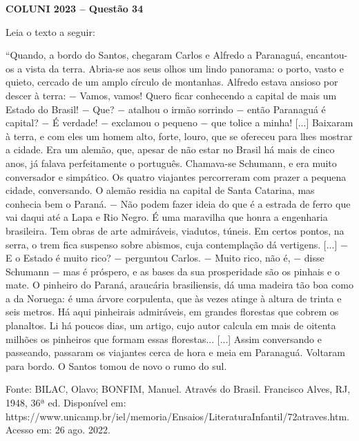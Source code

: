 \textbf{COLUNI 2023 -- Questão 34}\par\medskip Leia o texto a seguir:

\par

“Quando, a bordo do Santos, chegaram Carlos e Alfredo a Paranaguá, encantou-os a vista da terra. Abria-se aos seus olhos um lindo panorama: o porto, vasto e quieto, cercado de um amplo círculo de montanhas. Alfredo estava ansioso por descer à terra: − Vamos, vamos! Quero ficar conhecendo a capital de mais um Estado do Brasil! − Que? − atalhou o irmão sorrindo − então Paranaguá é capital? − É verdade! − exclamou o pequeno − que tolice a minha! [...] Baixaram à terra, e com eles um homem alto, forte, louro, que se ofereceu para lhes mostrar a cidade. Era um alemão, que, apesar de não estar no Brasil há mais de cinco anos, já falava perfeitamente o português. Chamava-se Schumann, e era muito conversador e simpático. Os quatro viajantes percorreram com prazer a pequena cidade, conversando. O alemão residia na capital de Santa Catarina, mas conhecia bem o Paraná. − Não podem fazer ideia do que é a estrada de ferro que vai daqui até a Lapa e Rio Negro. É uma maravilha que honra a engenharia brasileira. Tem obras de arte admiráveis, viadutos, túneis. Em certos pontos, na serra, o trem fica suspenso sobre abismos, cuja contemplação dá vertigens. [...] − E o Estado é muito rico? − perguntou Carlos. − Muito rico, não é, − disse Schumann − mas é próspero, e as bases da sua prosperidade são os pinhais e o mate. O pinheiro do Paraná, araucária brasiliensis, dá uma madeira tão boa como a da Noruega: é uma árvore corpulenta, que às vezes atinge à altura de trinta e seis metros. Há aqui pinheirais admiráveis, em grandes florestas que cobrem os planaltos. Li há poucos dias, um artigo, cujo autor calcula em mais de oitenta milhões os pinheiros que formam essas florestas... [...] Assim conversando e passeando, passaram os viajantes cerca de hora e meia em Paranaguá. Voltaram para bordo. O Santos tomou de novo o rumo do sul.

\par

Fonte: BILAC, Olavo; BONFIM, Manuel. Através do Brasil. Francisco Alves, RJ, 1948, 36ª ed. Disponível em: https://www.unicamp.br/iel/memoria/Ensaios/LiteraturaInfantil/72atraves.htm. Acesso em: 26 ago. 2022.

\par

